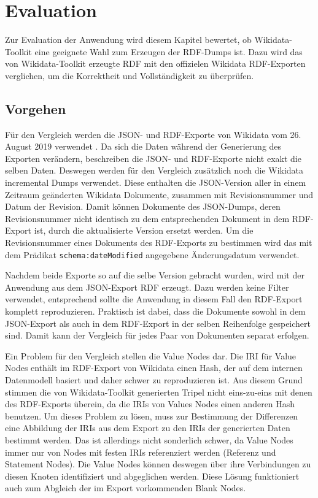 \chapter{Evaluation}
\label{chap:evaluation}
Zur Evaluation der Anwendung wird diesem Kapitel bewertet, ob Wikidata-Toolkit eine geeignete Wahl zum Erzeugen der RDF-Dumps ist.
Dazu wird das von Wikidata-Toolkit erzeugte RDF mit den offizielen Wikidata RDF-Exporten verglichen, um die Korrektheit und Vollständigkeit zu überprüfen.

\section{Vorgehen}
Für den Vergleich werden die JSON- und RDF-Exporte von Wikidata vom 26. August 2019 verwendet .
Da sich die Daten während der Generierung des Exporten verändern, beschreiben die JSON- und RDF-Exporte nicht exakt die selben Daten.
Deswegen werden für den Vergleich zusätzlich noch die Wikidata incremental Dumps verwendet.
Diese enthalten die JSON-Version aller in einem Zeitraum geänderten Wikidata Dokumente, zusammen mit Revisionsnummer und Datum der Revision. 
Damit können Dokumente des JSON-Dumps, deren Revisionsnummer nicht identisch zu dem entsprechenden Dokument in dem RDF-Export ist, durch die aktualisierte Version ersetzt werden.
Um die Revisionsnummer eines Dokuments des RDF-Exports zu bestimmen wird das mit dem Prädikat \verb|schema:dateModified| angegebene Änderungsdatum verwendet.

Nachdem beide Exporte so auf die selbe Version gebracht wurden, wird mit der Anwendung aus dem JSON-Export RDF erzeugt.
Dazu werden keine Filter verwendet, entsprechend sollte die Anwendung in diesem Fall den RDF-Export komplett reproduzieren.
Praktisch ist dabei, dass die Dokumente sowohl in dem JSON-Export als auch in dem RDF-Export in der selben Reihenfolge gespeichert sind.
Damit kann der Vergleich für jedes Paar von Dokumenten separat erfolgen.

Ein Problem für den Vergleich stellen die Value Nodes dar.
Die IRI für Value Nodes enthält im RDF-Export von Wikidata einen Hash, der auf dem internen Datenmodell basiert und daher schwer zu reproduzieren ist.
Aus diesem Grund stimmen die von Wikidata-Toolkit generierten Tripel nicht eins-zu-eins mit denen des RDF-Exports überein, da die IRIs von Values Nodes einen anderen Hash benutzen.
Um dieses Problem zu lösen, muss zur Bestimmung der Differenzen eine Abbildung der IRIs aus dem Export zu den IRIs der generierten Daten bestimmt werden.
Das ist allerdings nicht sonderlich schwer, da Value Nodes immer nur von Nodes mit festen IRIs referenziert werden (Referenz und Statement Nodes).
Die Value Nodes können deswegen über ihre Verbindungen zu diesen Knoten identifiziert und abgeglichen werden.
Diese Lösung funktioniert auch zum Abgleich der im Export vorkommenden Blank Nodes.

